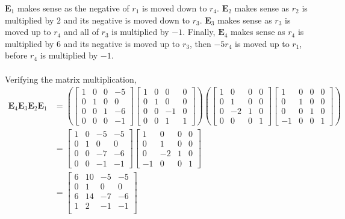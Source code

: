 \documentclass[]{article}
\begin{document}
\(\mathbf{E}_1\) makes sense as the negative of \(r_1\) is moved down to \(r_4\). 
\(\mathbf{E}_2\) makes sense as \(r_2\) is multiplied by \(2\) and its negative is moved down to \(r_3\). 
\(\mathbf{E}_3\) makes sense as \(r_3\) is moved up to \(r_4\) and all of \(r_3\) is multiplied by \(-1\). 
Finally, \(\mathbf{E}_4\) makes sense as \(r_4\) is multiplied by 6 and its negative is moved up to \(r_3\), then \(-5r_4\) is moved up to \(r_1\), before \(r_4\) is multiplied by \(-1\). \\
\\
Verifying the matrix multiplication, 
\begin{align}
	\mathbf{E}_4 \mathbf{E}_3 \mathbf{E}_2 \mathbf{E}_1 &= 
	\left(\begin{bmatrix}
	1 & 0 & 0 & -5 \\
	0 & 1 & 0 & 0 \\
	0 & 0 & 1 & -6 \\
	0 & 0 & 0 & -1
	\end{bmatrix}
	\begin{bmatrix}
	1 & 0 & 0 & 0 \\
	0 & 1 & 0 & 0 \\
	0 & 0 & -1 & 0 \\
	0 & 0 & 1 & 1
	\end{bmatrix}\right)
	\left(\begin{bmatrix}
	1 & 0 & 0 & 0 \\
	0 & 1 & 0 & 0 \\
	0 & -2 & 1 & 0 \\
	0 & 0 & 0 & 1
	\end{bmatrix}
	\begin{bmatrix}
	1 & 0 & 0 & 0 \\
	0 & 1 & 0 & 0 \\
	0 & 0 & 1 & 0 \\
	-1 & 0 & 0 & 1
	\end{bmatrix}\right) \\
	&= 
	\begin{bmatrix}
	1 & 0 & -5 & -5 \\
	0 & 1 & 0 & 0 \\
	0 & 0 & -7 & -6 \\
	0 & 0 & -1 & -1
	\end{bmatrix}
	\begin{bmatrix}
	1 & 0 & 0 & 0 \\
	0 & 1 & 0 & 0 \\
	0 & -2 & 1 & 0 \\
	-1 & 0 & 0 & 1
	\end{bmatrix} \\
	&=
	\begin{bmatrix}
	6 & 10 & -5 & -5 \\
	0 & 1 & 0 & 0 \\
	6 & 14 & -7 & -6 \\
	1 & 2 & -1 & -1 \\
	\end{bmatrix}
\end{align}
\end{document}
